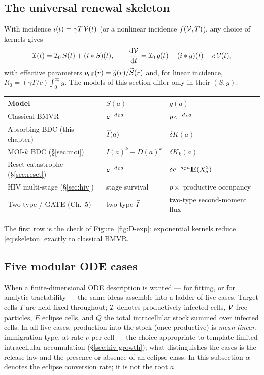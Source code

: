 \subsection{The universal renewal skeleton}
\label{sec:skeleton}

With incidence $i(t)=\gamma T\,\mathcal{V}(t)$ (or a nonlinear incidence
$f(\mathcal{V},T)$), any choice of kernels gives
\begin{equation}
\mathcal{I}(t)=\mathcal{I}_0\,S(t)+(i*S)(t),
\qquad
\displaystyle\frac{{\rm d} \mathcal{V}}{{\rm d} t}=\mathcal{I}_0\,g(t)+(i*g)(t)-c\,\mathcal{V}(t),
\label{eq:skeleton}
\end{equation}
with effective parameters $p_{\rm eff}(r)=\widetilde{g}(r)/\widetilde{S}(r)$ and, for
linear incidence, $R_0=(\gamma T/c)\int_0^\infty g$. The models of this
section differ only in their $(S,g)$:
\begin{center}
\renewcommand{\arraystretch}{1.2}
\small
\begin{tabular}{@{}lll@{}}
\toprule
Model & $S(a)$ & $g(a)$ \\
\midrule
Classical BMVR & $e^{-d_{\mathcal{I}} a}$ & $p\,e^{-d_{\mathcal{I}} a}$ \\
Absorbing BDC (this chapter) & $\widehat{I}(a)$ & $\delta K(a)$ \\
MOI-$k$ BDC (\S\ref{sec:moi}) & $I(a)^k-D(a)^k$ & $\delta K_k(a)$ \\
Reset catastrophe (\S\ref{sec:reset}) & $e^{-d_{\mathcal{I}} a}$ & $\delta e^{-d_{\mathcal{I}}a}{\rm I}\!{\rm E}(X_a^2)$ \\
HIV multi-stage (\S\ref{sec:hiv}) & stage survival & $p\times$ productive occupancy \\
Two-type / GATE (Ch.~5) & two-type $\widehat{I}$ & two-type second-moment flux \\
\bottomrule
\end{tabular}
\end{center}
The first row is the check of Figure~\ref{fig:D-exp}: exponential kernels
reduce \eqref{eq:skeleton} exactly to classical BMVR.

\subsection{Five modular ODE cases}
\label{sec:five-cases}

When a finite-dimensional ODE description is wanted --- for fitting, or for
analytic tractability --- the same ideas assemble into a ladder of five
cases. Target cells $T$ are held fixed throughout; $\mathcal{I}$ denotes
productively infected cells, $\mathcal{V}$ free particles, $E$ eclipse cells,
and $Q$ the total intracellular stock summed over infected cells. In all
five cases, production into the stock (once productive) is
\emph{mean-linear}, immigration-type, at rate $\nu$ per cell --- the choice
appropriate to template-limited intracellular accumulation
(\S\ref{sec:hiv-growth}); what distinguishes the cases is the release law
and the presence or absence of an eclipse class. In this subsection
$\alpha$ denotes the eclipse conversion rate; it is not the root $a$.

